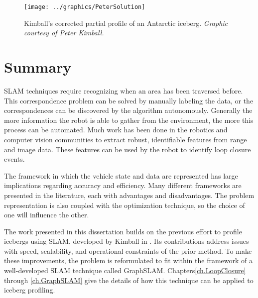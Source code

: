  \begin{figure}[!htb]
   \centering
   \texttt{[image: ../graphics/PeterSolution]} %
   \caption{Kimball's corrected partial profile of an Antarctic iceberg. \emph{Graphic courtesy of Peter Kimball.}}
   \label{fig:KimballSolution}
\end{figure}

\section{Summary}

SLAM techniques require recognizing when an area has been traversed before. This correspondence problem can be solved by manually labeling the data, or the correspondences can be discovered by the algorithm autonomously. Generally the more information the robot is able to gather from the environment, the more this process can be automated. Much work has been done in the robotics and computer vision communities to extract robust, identifiable features from range and image data. These features can be used by the robot to identify loop closure events. 

The framework in which the vehicle state and data are represented has large implications regarding accuracy and efficiency. Many different frameworks are presented in the literature, each with advantages and disadvantages. The problem representation is also coupled with the optimization technique, so the choice of one will influence the other.

The work presented in this dissertation builds on the previous effort to profile icebergs using SLAM, developed by Kimball in \cite{Kimball2011b}. Its contributions address issues with speed, scalability, and operational constraints of the prior method. To make these improvements, the problem is reformulated to fit within the framework of a well-developed SLAM technique called GraphSLAM. Chapters\ref{ch.LoopClosure} through \ref{ch.GraphSLAM} give the details of how this technique can be applied to iceberg profiling.

